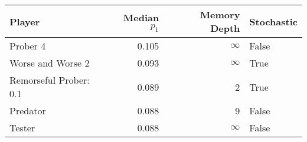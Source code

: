\begin{tabular}{lrrl}
\toprule
                 Player &  Median $p_1$ &  Memory Depth & Stochastic \\
\midrule
               Prober 4 &         0.105 &            \(\infty\) &      False \\
      Worse and Worse 2 &         0.093 &            \(\infty\) &       True \\
 Remorseful Prober: 0.1 &         0.089 &             2 &       True \\
               Predator &         0.088 &             9 &      False \\
                 Tester &         0.088 &            \(\infty\) &      False \\
\bottomrule
\end{tabular}
